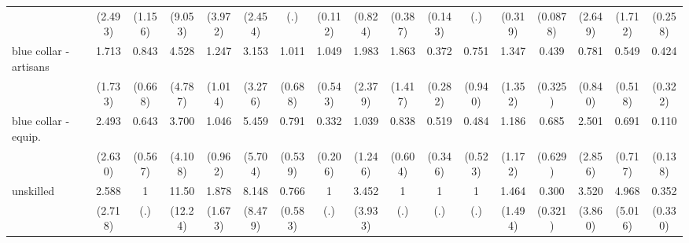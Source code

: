 {\begin{tabular}{l*{16}{c}}
                    &     (2.493)         &     (1.156)         &     (9.053)         &     (3.972)         &     (2.454)         &         (.)         &     (0.112)         &     (0.824)         &     (0.387)         &     (0.143)         &         (.)         &     (0.319)         &    (0.0878)         &     (2.649)         &     (1.712)         &     (0.258)         \\
[1em]
blue collar - artisans&       1.713         &       0.843         &       4.528         &       1.247         &       3.153         &       1.011         &       1.049         &       1.983         &       1.863         &       0.372         &       0.751         &       1.347         &       0.439         &       0.781         &       0.549         &       0.424         \\
                    &     (1.733)         &     (0.668)         &     (4.787)         &     (1.014)         &     (3.276)         &     (0.688)         &     (0.543)         &     (2.379)         &     (1.417)         &     (0.282)         &     (0.940)         &     (1.352)         &     (0.325)         &     (0.840)         &     (0.518)         &     (0.322)         \\
[1em]
blue collar - equip.&       2.493         &       0.643         &       3.700         &       1.046         &       5.459         &       0.791         &       0.332         &       1.039         &       0.838         &       0.519         &       0.484         &       1.186         &       0.685         &       2.501         &       0.691         &       0.110         \\
                    &     (2.630)         &     (0.567)         &     (4.108)         &     (0.962)         &     (5.704)         &     (0.539)         &     (0.206)         &     (1.246)         &     (0.604)         &     (0.346)         &     (0.523)         &     (1.172)         &     (0.629)         &     (2.856)         &     (0.717)         &     (0.138)         \\
[1em]
unskilled           &       2.588         &           1         &       11.50\sym{*}  &       1.878         &       8.148\sym{*}  &       0.766         &           1         &       3.452         &           1         &           1         &           1         &       1.464         &       0.300         &       3.520         &       4.968         &       0.352         \\
                    &     (2.718)         &         (.)         &     (12.24)         &     (1.673)         &     (8.479)         &     (0.583)         &         (.)         &     (3.933)         &         (.)         &         (.)         &         (.)         &     (1.494)         &     (0.321)         &     (3.860)         &     (5.016)         &     (0.330)         \\

\end{tabular}}
